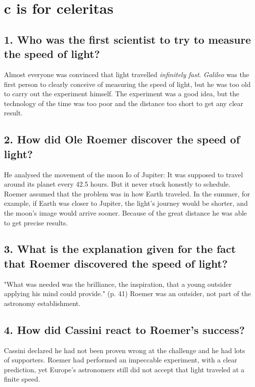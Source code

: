 %
\newpage
\section{c is for celeritas}

\subsection*{1. Who was the first scientist to try to measure the speed of light?}
Almost everyone was convinced that light travelled \emph{infinitely fast}. \emph{Galileo} was the first person to clearly conceive of measuring the speed of light, but he was too old to carry out the experiment himself. The experiment was a good idea, but the technology of the time was too poor and the distance too short to get any clear result.

\subsection*{2. How did Ole Roemer discover the speed of light?}
He analysed the movement of the moon Io of Jupiter: It was supposed to travel around its planet every 42.5 hours. But it never stuck honestly to schedule. Roemer assumed that the problem was in how Earth traveled. In the summer, for example, if Earth was closer to Jupiter, the light's journey would be shorter, and the moon's image would arrive sooner. Because of the great distance he was able to get precise results.

\subsection*{3. What is the explanation given for the fact that Roemer discovered the speed of light?}
"What was needed was the brilliance, the inspiration, that a young outsider applying his mind could provide." (p. 41) Roemer was an outsider, not part of the astronomy establishment.

\subsection*{4. How did Cassini react to Roemer's success?}
Cassini declared he had not been proven wrong at the challenge and he had lots of supporters. Roemer had performed an impeccable experiment, with a clear prediction, yet Europe's astronomers still did not accept that light traveled at a finite speed.

